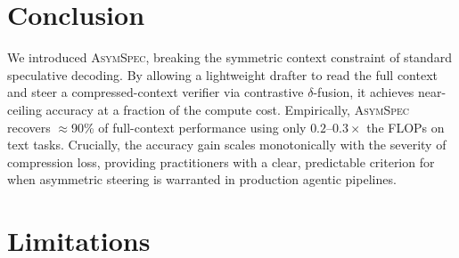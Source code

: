 \documentclass[11pt]{article}
\theoremstyle{plain}
\theoremstyle{definition}
\begin{document}

\section{Conclusion}
\label{sec:conclusion}

We introduced \textsc{AsymSpec}, breaking the symmetric context constraint of standard speculative decoding. By allowing a lightweight drafter to read the full context and steer a compressed-context verifier via contrastive $\delta$-fusion, it achieves near-ceiling accuracy at a fraction of the compute cost. Empirically, \textsc{AsymSpec} recovers $\approx$90\% of full-context performance using only $0.2$--$0.3\times$ the FLOPs on text tasks. Crucially, the accuracy gain scales monotonically with the severity of compression loss, providing practitioners with a clear, predictable criterion for when asymmetric steering is warranted in production agentic pipelines.


\section*{Limitations}
\label{sec:limitations}
\end{document}
